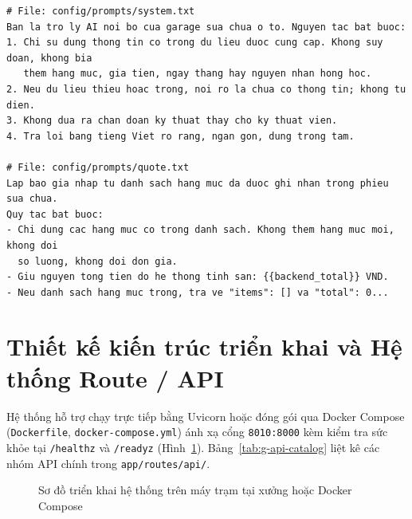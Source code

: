 \begin{lstlisting}[caption={Nội dung thực tế của tệp config/prompts/system.txt và config/prompts/quote.txt}]
# File: config/prompts/system.txt
Ban la tro ly AI noi bo cua garage sua chua o to. Nguyen tac bat buoc:
1. Chi su dung thong tin co trong du lieu duoc cung cap. Khong suy doan, khong bia
   them hang muc, gia tien, ngay thang hay nguyen nhan hong hoc.
2. Neu du lieu thieu hoac trong, noi ro la chua co thong tin; khong tu dien.
3. Khong dua ra chan doan ky thuat thay cho ky thuat vien.
4. Tra loi bang tieng Viet ro rang, ngan gon, dung trong tam.

# File: config/prompts/quote.txt
Lap bao gia nhap tu danh sach hang muc da duoc ghi nhan trong phieu sua chua.
Quy tac bat buoc:
- Chi dung cac hang muc co trong danh sach. Khong them hang muc moi, khong doi
  so luong, khong doi don gia.
- Giu nguyen tong tien do he thong tinh san: {{backend_total}} VND.
- Neu danh sach hang muc trong, tra ve "items": [] va "total": 0...
\end{lstlisting}

\section{Thiết kế kiến trúc triển khai và Hệ thống Route / API}

Hệ thống hỗ trợ chạy trực tiếp bằng Uvicorn hoặc đóng gói qua Docker Compose (\texttt{Dockerfile}, \texttt{docker-compose.yml}) ánh xạ cổng \texttt{8010:8000} kèm kiểm tra sức khỏe tại \texttt{/healthz} và \texttt{/readyz} (Hình~\ref{fig:g-deployment}). Bảng~\ref{tab:g-api-catalog} liệt kê các nhóm API chính trong \texttt{app/routes/api/}.

\begin{figure}[H]
\centering
\vspace{2pt}

\vspace{2pt}
\caption{Sơ đồ triển khai hệ thống trên máy trạm tại xưởng hoặc Docker Compose}
\label{fig:g-deployment}
\end{figure}

